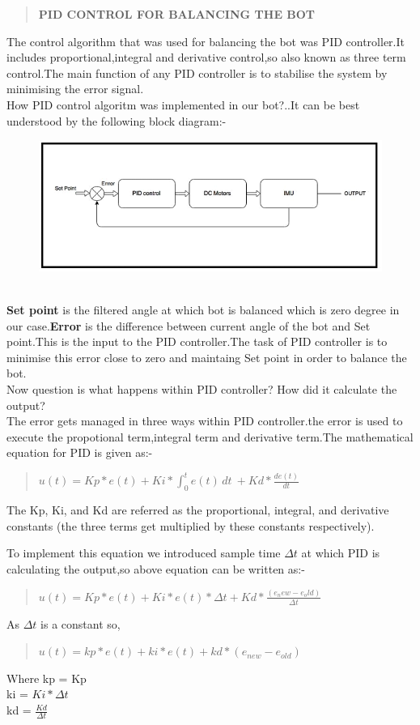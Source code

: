 \documentclass[12pt]{report}
\begin{document}
	\begin{quote}
	\centering\textbf{\large PID CONTROL FOR BALANCING THE BOT}
	\end{quote}
	The control algorithm that was used for balancing the bot was PID controller.It includes proportional,integral and derivative control,so also known as three term control.The main function of any PID controller is to stabilise the system by minimising the error signal. \\
	How PID control algoritm was implemented in our bot?..It can be best understood by the following block diagram:- \\
    \begin{figure}[h]
    	\centering
    	\includegraphics[scale=0.6]{PID.png}
    \end{figure} \\
    \textbf{Set point} is the filtered angle at which bot is balanced which is zero degree in our case.\textbf{Error} is the difference between current angle of the bot and Set point.This is the input to the PID controller.The task of PID controller is to minimise this error close to zero and maintaing Set point in order to balance the bot.\\
    Now question is what happens within PID controller? How did it calculate the output? \\
    The error gets managed in three ways within PID controller.the error is used to execute the propotional term,integral term and derivative term.The mathematical equation for PID is given as:-
    \begin{quote}
    	\centering $ u(t) = Kp*e(t) + Ki* \int_{0}^{t}e(t)\,dt\ + Kd*\frac{de(t)}{dt} $
    \end{quote}
     The Kp, Ki, and Kd are referred as the
     proportional, integral, and derivative constants (the three terms get multiplied by these constants respectively).
     
     To implement this equation we introduced sample time  $\Delta t$ at which PID is calculating the output,so above equation can be written as:-
      \begin{quote}
      	\centering  $ u(t) = Kp*e(t) + Ki*e(t)*\Delta t +Kd*\frac{(e_new - e_old)}{\Delta t} $
      \end{quote}
    As $\Delta t$ is a constant so,
     \begin{quote}
     	\centering  $u(t) = kp*e(t) + ki*e(t) + kd*(e_{new} - e_{old})$
     \end{quote}
    Where kp = Kp \\
          ki = $Ki*\Delta t$  \\
          kd = $\frac{Kd}{\Delta t}$ \\ \\
          
\end{document}

